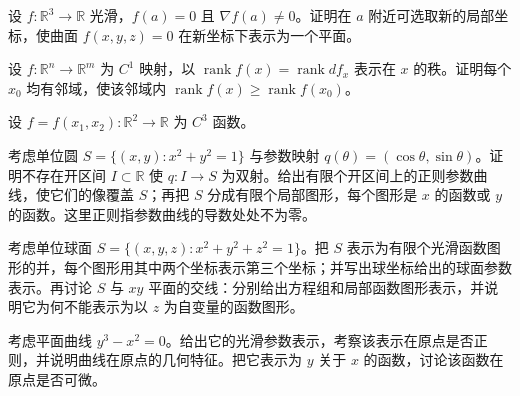 \noindent\begin{minipage}{\textwidth}
设 $f:\mathbb R^3\to\mathbb R$ 光滑，$f(a)=0$ 且 $\nabla f(a)\ne0$。证明在 $a$ 附近可选取新的局部坐标，使曲面 $f(x,y,z)=0$ 在新坐标下表示为一个平面。
\end{minipage}\par\vfill
\noindent\begin{minipage}{\textwidth}
设 $f:\mathbb R^n\to\mathbb R^m$ 为 $C^1$ 映射，以 $\operatorname{rank}f(x)=\operatorname{rank}df_x$ 表示在 $x$ 的秩。证明每个 $x_0$ 均有邻域，使该邻域内 $\operatorname{rank}f(x)\ge\operatorname{rank}f(x_0)$。
\end{minipage}\par\vfill
\newpage
\noindent\begin{minipage}{\textwidth}
设 $f=f(x_1,x_2):\mathbb R^2\to\mathbb R$ 为 $C^3$ 函数。
\end{minipage}\par\vfill
\noindent\begin{minipage}{\textwidth}
考虑单位圆 $S=\{(x,y):x^2+y^2=1\}$ 与参数映射 $q(\theta)=(\cos\theta,\sin\theta)$。证明不存在开区间 $I\subset\mathbb R$ 使 $q:I\to S$ 为双射。给出有限个开区间上的正则参数曲线，使它们的像覆盖 $S$；再把 $S$ 分成有限个局部图形，每个图形是 $x$ 的函数或 $y$ 的函数。这里正则指参数曲线的导数处处不为零。
\end{minipage}\par\vfill
\noindent\begin{minipage}{\textwidth}
考虑单位球面 $S=\{(x,y,z):x^2+y^2+z^2=1\}$。把 $S$ 表示为有限个光滑函数图形的并，每个图形用其中两个坐标表示第三个坐标；并写出球坐标给出的球面参数表示。再讨论 $S$ 与 $xy$ 平面的交线：分别给出方程组和局部函数图形表示，并说明它为何不能表示为以 $z$ 为自变量的函数图形。
\end{minipage}\par\vfill
\noindent\begin{minipage}{\textwidth}
考虑平面曲线 $y^3-x^2=0$。给出它的光滑参数表示，考察该表示在原点是否正则，并说明曲线在原点的几何特征。把它表示为 $y$ 关于 $x$ 的函数，讨论该函数在原点是否可微。
\end{minipage}\par\vfill
